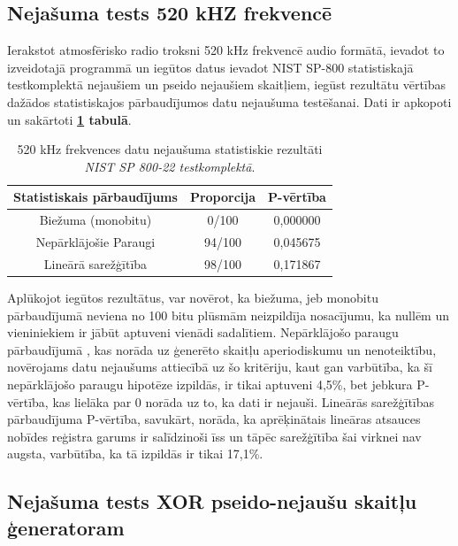 \documentclass[12pt]{article}
\begin{document}
    \subsection{Nejašuma tests 520 kHZ frekvencē}

    Ierakstot atmosfērisko radio troksni 520 kHz frekvencē audio formātā, ievadot to izveidotajā programmā un iegūtos datus ievadot NIST SP-800 statistiskajā testkomplektā nejaušiem un pseido nejaušiem skaitļiem, iegūst rezultātu vērtības dažādos statistiskajos pārbaudījumos datu nejaušuma testēšanai. Dati ir apkopoti un sakārtoti \textbf{\ref{rezultati_520} tabulā}.

\begin{table}[!ht]
\centering

\begin{tabular}{ |c|c|c| }%
\hline
Statistiskais pārbaudījums & Proporcija & P-vērtība \\
\hline
Biežuma (monobitu) & 0/100 & 0,000000\\
\hline
Nepārklājošie Paraugi & 94/100 & 0,045675 \\
\hline
Lineārā sarežģītība & 98/100 & 0,171867 \\
\hline
\end{tabular}

\caption{520 kHz frekvences datu nejaušuma statistiskie rezultāti \\ \emph{NIST SP 800-22 testkomplektā}.\parencite{NIST_orig}}

\label{rezultati_520}
\end{table}

  \FloatBarrier
    Aplūkojot iegūtos rezultātus, var novērot, ka  biežuma, jeb monobitu pārbaudījumā neviena no 100 bitu plūsmām neizpildīja nosacījumu, ka nullēm un vieniniekiem ir jābūt aptuveni vienādi sadalītiem. Nepārklājošo paraugu pārbaudījumā , kas norāda uz ģenerēto skaitļu aperiodiskumu un nenoteiktību, novērojams datu nejaušums attiecībā uz šo kritēriju, kaut gan varbūtība, ka šī nepārklājošo paraugu hipotēze izpildās, ir tikai aptuveni 4,5\%, bet jebkura P-vērtība, kas lielāka par 0 norāda uz to, ka dati ir nejauši.
    Lineārās sarežģītības pārbaudījuma P-vērtība, savukārt, norāda, ka aprēķinātais lineāras atsauces nobīdes reģistra garums ir salīdzinoši īss un tāpēc sarežģītība šai virknei nav augsta, varbūtība, ka tā izpildās ir tikai 17,1\%. 

    
 \subsection{Nejašuma tests XOR pseido-nejaušu skaitļu ģeneratoram}
\end{document}
